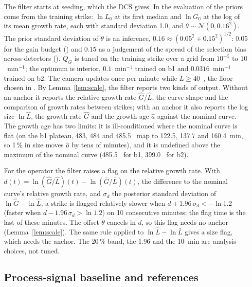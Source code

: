 The filter starts at seeding, which the DCS gives. In the evaluation of  the priors come from
the training strike: $\ln L_0$ at its first median and $\ln G_0$ at the log of its mean growth rate, each with
standard deviation 1.0, and $\theta \sim \mathcal{N}(0, 0.16^2)$. The prior standard deviation of $\theta$ is an inference,
$0.16 \approx (0.05^2 + 0.15^2)^{1/2}$: 0.05 for the gain budget () and 0.15 as a judgement of the
spread of the selection bias across detectors (). $Q_G$ is tuned on the training strike over a grid from $10^{-5}$ to
$10$~min$^{-1}$; the optimum is interior, $0.1$~min$^{-1}$ trained on b1 and $0.0316$~min$^{-1}$ trained on b2. The camera updates once per minute while $L \ge 40$~\um, the floor chosen in
. By Lemma~\ref{lem:scale}, the filter reports two kinds of output. Without an anchor it reports the relative
growth rate $\hat G/\hat L$, the curve shape and the comparison of growth rates between strikes; with an anchor it
also reports the log size $\ln \hat L$, the growth rate $\hat G$ and the growth age $\hat a$ against the nominal
curve. The growth age has two limits: it is ill-conditioned where the nominal curve is flat (on the b1 plateau,
483, 484 and 485.5~\um{} map to 122.5, 137.7 and 160.4~min, so 1\,\% in size moves $\hat a$ by tens of minutes), and
it is undefined above the maximum of the nominal curve (485.5~\um{} for b1, 399.0~\um{} for b2).

For the operator the filter raises a flag on the relative growth rate. With
$d(t) = \ln(\hat G/\hat L)(t) - \ln(\bar G/\bar L)(t)$, the difference to the nominal curve's relative growth rate,
and $\sigma_d$ the posterior standard deviation of $\ln \hat G - \ln \hat L$, a strike is flagged relatively slower
when $d + 1.96\,\sigma_d < -\ln 1.2$ (faster when $d - 1.96\,\sigma_d > \ln 1.2$) on 10 consecutive minutes; the flag
time is the last of these minutes. The offset $\theta$ cancels in $d$, so this flag needs no anchor
(Lemma~\ref{lem:scale}). The same rule applied to $\ln \hat L - \ln \bar L$ gives a size flag, which needs the
anchor. The 20\,\% band, the 1.96 and the 10~min are analysis choices, not tuned.

\subsection{Process-signal baseline and references}\label{sec:baseline}


